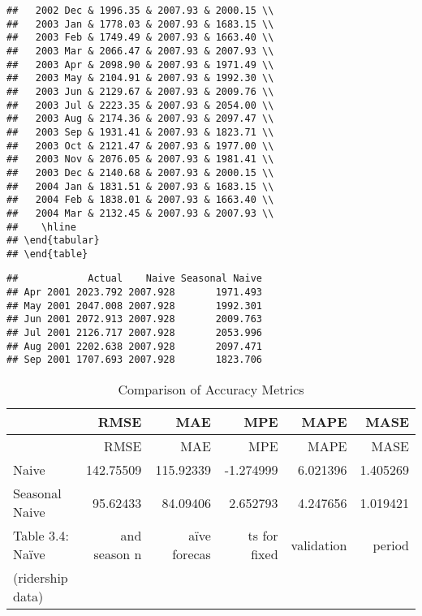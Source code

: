 \documentclass[]{article}
\begin{document}
\begin{verbatim}
##   2002 Dec & 1996.35 & 2007.93 & 2000.15 \\ 
##   2003 Jan & 1778.03 & 2007.93 & 1683.15 \\ 
##   2003 Feb & 1749.49 & 2007.93 & 1663.40 \\ 
##   2003 Mar & 2066.47 & 2007.93 & 2007.93 \\ 
##   2003 Apr & 2098.90 & 2007.93 & 1971.49 \\ 
##   2003 May & 2104.91 & 2007.93 & 1992.30 \\ 
##   2003 Jun & 2129.67 & 2007.93 & 2009.76 \\ 
##   2003 Jul & 2223.35 & 2007.93 & 2054.00 \\ 
##   2003 Aug & 2174.36 & 2007.93 & 2097.47 \\ 
##   2003 Sep & 1931.41 & 2007.93 & 1823.71 \\ 
##   2003 Oct & 2121.47 & 2007.93 & 1977.00 \\ 
##   2003 Nov & 2076.05 & 2007.93 & 1981.41 \\ 
##   2003 Dec & 2140.68 & 2007.93 & 2000.15 \\ 
##   2004 Jan & 1831.51 & 2007.93 & 1683.15 \\ 
##   2004 Feb & 1838.01 & 2007.93 & 1663.40 \\ 
##   2004 Mar & 2132.45 & 2007.93 & 2007.93 \\ 
##    \hline
## \end{tabular}
## \end{table}
\end{verbatim}

\begin{verbatim}
##            Actual    Naive Seasonal Naive
## Apr 2001 2023.792 2007.928       1971.493
## May 2001 2047.008 2007.928       1992.301
## Jun 2001 2072.913 2007.928       2009.763
## Jul 2001 2126.717 2007.928       2053.996
## Aug 2001 2202.638 2007.928       2097.471
## Sep 2001 1707.693 2007.928       1823.706
\end{verbatim}

\begin{longtable}[]{@{}lrrrrr@{}}
\caption{Comparison of Accuracy Metrics}\tabularnewline
\toprule
& RMSE & MAE & MPE & MAPE & MASE\tabularnewline
\midrule
\endfirsthead
\toprule
& RMSE & MAE & MPE & MAPE & MASE\tabularnewline
\midrule
\endhead
Naive & 142.75509 & 115.92339 & -1.274999 & 6.021396 &
1.405269\tabularnewline
Seasonal Naive & 95.62433 & 84.09406 & 2.652793 & 4.247656 &
1.019421\tabularnewline
Table 3.4: Naïve & and season n & aïve forecas & ts for fixed &
validation & period\tabularnewline
(ridership data) & & & & &\tabularnewline
\bottomrule
\end{longtable}
\end{document}
